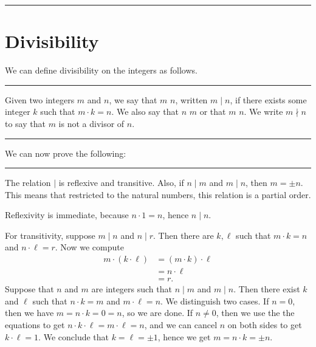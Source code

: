 \documentclass[letterpaper,10pt,english]{sphinxmanual}
\begin{document}
\bigskip\hrule\bigskip



\section{Divisibility}
\label{\detokenize{elementary_number_theory:divisibility}}
\sphinxAtStartPar
We can define divisibility on the integers as follows.


\bigskip\hrule\bigskip


\sphinxAtStartPar
{} Given two integers \(m\) and \(n\), we say that \(m\)  \(n\), written \(m \mid n\), if there exists some integer \(k\) such that \(m \cdot k = n\). We also say that \(n\)  \(m\) or that \(m\)  \(n\). We write \(m \nmid n\) to say that \(m\) is not a divisor of \(n\).


\bigskip\hrule\bigskip


\sphinxAtStartPar
We can now prove the following:


\bigskip\hrule\bigskip


\sphinxAtStartPar
{} The relation \(\mid\) is reflexive and transitive. Also, if \(n \mid m\) and \(m \mid n\), then \(m = \pm n\). This means that restricted to the natural numbers, this relation is a partial order.

\sphinxAtStartPar
{} Reflexivity is immediate, because \(n \cdot 1 = n\), hence \(n\mid n\).

\sphinxAtStartPar
For transitivity, suppose \(m \mid n\) and \(n \mid r\). Then there are \(k,\ell\) such that \(m \cdot k = n\) and \(n \cdot \ell = r\). Now we compute
\begin{equation*}
\begin{split}m \cdot (k \cdot \ell) &= (m \cdot k) \cdot \ell \\
& = n \cdot \ell  \\
& = r.\end{split}
\end{equation*}
\sphinxAtStartPar
Suppose that \(n\) and \(m\) are integers such that \(n\mid m\) and \(m \mid n\). Then there exist \(k\) and \(\ell\) such that \(n\cdot k = m\) and \(m \cdot \ell = n\). We distinguish two cases. If \(n = 0\), then we have \(m = n\cdot k = 0 = n\), so we are done. If \(n \neq 0\), then we use the the equations to get \(n \cdot k \cdot \ell = m \cdot \ell = n\), and we can cancel \(n\) on both sides to get \(k \cdot \ell = 1\). We conclude that \(k = \ell = \pm 1\), hence we get \(m = n \cdot k = \pm n\).
\end{document}
